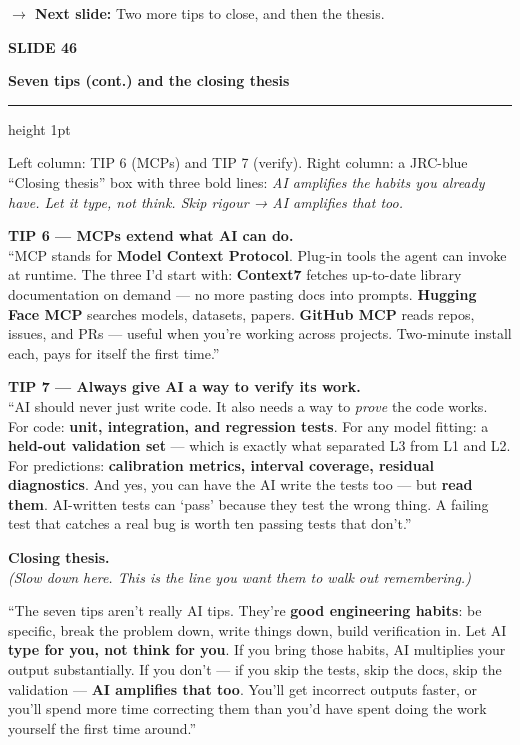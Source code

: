 \documentclass[11pt,a4paper]{article}
\newcommand{\slidehead}[2]{%
  \vspace{2pt}%
  {\small\color{mutedgrey}\textbf{SLIDE #1}}\par
  {\LARGE\color{jrcblue}\bfseries #2}\par
  \vspace{6pt}%
  {\color{jrcblue}\hrule height 1pt}%
  \vspace{8pt}%
}
\newcommand{\block}[1]{\par\vspace{4pt}{\small\color{jrcblue}\textbf{\MakeUppercase{#1}}}\par\vspace{2pt}}
\newenvironment{sayblock}{%
  \begin{tcolorbox}[colback=cardbg, colframe=jrcblue, boxrule=0.8pt, arc=2pt,
                    left=10pt, right=10pt, top=6pt, bottom=6pt, fontupper=\normalsize,
                    title={\bfseries Say this}, coltitle=white, colbacktitle=jrcblue,
                    fonttitle=\small\bfseries]
}{%
  \end{tcolorbox}
}
\newcommand{\transition}[1]{%
  \par\vspace{4pt}%
  \begin{tcolorbox}[colback=white, colframe=mutedgrey!40, boxrule=0.5pt, arc=2pt,
                    left=10pt, right=10pt, top=4pt, bottom=4pt, fontupper=\small]
    {\color{mutedgrey}\textbf{\textsf{$\to$ Next slide:}}} #1
  \end{tcolorbox}
}
\begin{document}
\transition{Two more tips to close, and then the thesis.}

\newpage

\slidehead{46}{Seven tips (cont.) and the closing thesis}

\block{On screen}
Left column: TIP 6 (MCPs) and TIP 7 (verify). Right column: a JRC-blue
``Closing thesis'' box with three bold lines: \textit{AI amplifies the habits
you already have. Let it type, not think. Skip rigour → AI amplifies that too.}

\begin{sayblock}
\textbf{TIP 6 — MCPs extend what AI can do.}\\
``MCP stands for \textbf{Model Context Protocol}. Plug-in tools the agent can
invoke at runtime. The three I'd start with: \textbf{Context7} fetches
up-to-date library documentation on demand — no more pasting docs into prompts.
\textbf{Hugging Face MCP} searches models, datasets, papers. \textbf{GitHub
MCP} reads repos, issues, and PRs — useful when you're working across
projects. Two-minute install each, pays for itself the first time.''\par\vspace{6pt}

\textbf{TIP 7 — Always give AI a way to verify its work.}\\
``AI should never just write code. It also needs a way to \emph{prove} the
code works. For code: \textbf{unit, integration, and regression tests}. For
any model fitting: a \textbf{held-out validation set} — which is exactly what
separated L3 from L1 and L2. For predictions: \textbf{calibration metrics,
interval coverage, residual diagnostics}. And yes, you can have the AI write
the tests too — but \textbf{read them}. AI-written tests can `pass' because
they test the wrong thing. A failing test that catches a real bug is worth
ten passing tests that don't.''\par\vspace{8pt}

\textbf{Closing thesis.}\\
\textit{(Slow down here. This is the line you want them to walk out
remembering.)}\par\vspace{4pt}

``The seven tips aren't really AI tips. They're \textbf{good engineering
habits}: be specific, break the problem down, write things down, build
verification in. Let AI \textbf{type for you, not think for you}. If you bring
those habits, AI multiplies your output substantially. If you don't — if you
skip the tests, skip the docs, skip the validation — \textbf{AI amplifies
that too}. You'll get incorrect outputs faster, or you'll spend more time
correcting them than you'd have spent doing the work yourself the first time
around.''\par\vspace{4pt}


\end{sayblock}
\end{document}
